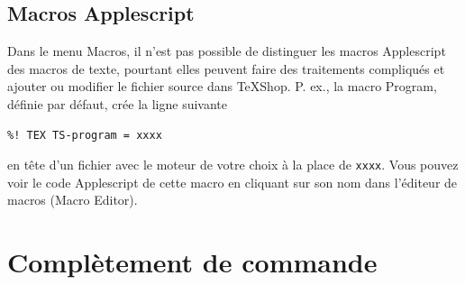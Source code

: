 \documentclass[11pt,french]{article}
\newcommand{\TS}{\textsf{\TeX Shop}}
\newcommand{\mnu}[1]{\textsf{#1}}
\begin{document}
\subsection{Macros Applescript}

Dans le menu \mnu{Macros}, il n'est pas possible de distinguer les macros Applescript des macros de texte, pourtant elles peuvent faire des traitements compliqués et ajouter ou modifier le fichier source dans \TS{}. P. ex., la macro \mnu{Program}, définie par défaut, crée la ligne suivante
\begin{verbatim}
%! TEX TS-program = xxxx
\end{verbatim}
en tête d'un fichier avec le moteur de votre choix à la place de \texttt{xxxx}. Vous pouvez voir le code Applescript de cette macro en cliquant sur son nom dans l'éditeur de macros (\mnu{Macro Editor}). 




\section{Complètement de commande}\label{sec:CC}
\end{document}
